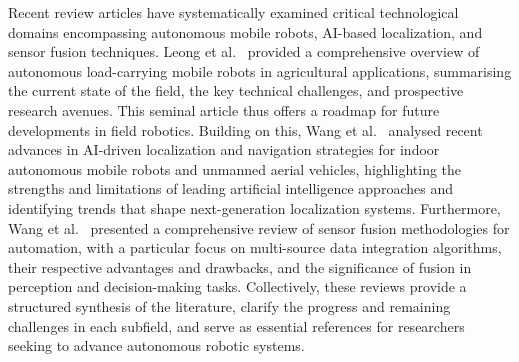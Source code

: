 \documentclass[a4paper,fleqn]{cas-dc}
\begin{document}
Recent review articles have systematically examined critical technological domains encompassing autonomous mobile robots, AI-based localization, and sensor fusion techniques. Leong et al.~\cite{10614599} provided a comprehensive overview of autonomous load-carrying mobile robots in agricultural applications, summarising the current state of the field, the key technical challenges, and prospective research avenues. This seminal article thus offers a roadmap for future developments in field robotics. Building on this, Wang et al.~\cite{10806702} analysed recent advances in AI-driven localization and navigation strategies for indoor autonomous mobile robots and unmanned aerial vehicles, highlighting the strengths and limitations of leading artificial intelligence approaches and identifying trends that shape next-generation localization systems. Furthermore, Wang et al.~\cite{WANG2025101977} presented a comprehensive review of sensor fusion methodologies for automation, with a particular focus on multi-source data integration algorithms, their respective advantages and drawbacks, and the significance of fusion in perception and decision-making tasks. Collectively, these reviews provide a structured synthesis of the literature, clarify the progress and remaining challenges in each subfield, and serve as essential references for researchers seeking to advance autonomous robotic systems.
\end{document}
